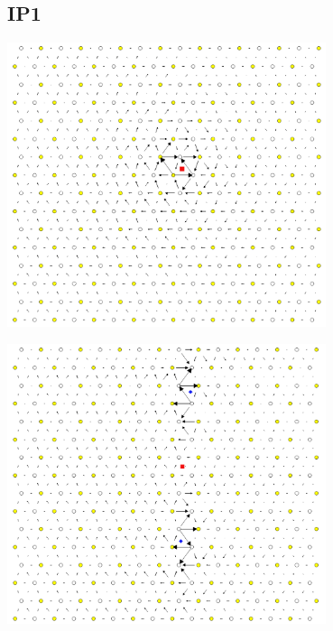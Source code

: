 \documentclass[11pt]{article}
\begin{document}
\subsection{IP1}
\label{sec:org1ea90ca}
\begin{center}
\includegraphics[width=0.7\textwidth]{Images/final_model_IP1_partial_dd_initial.png}
\end{center}
\begin{center}
\includegraphics[width=0.7\textwidth]{Images/final_model_IP1_partial_dd_final.png}
\end{center} 
\end{document}
